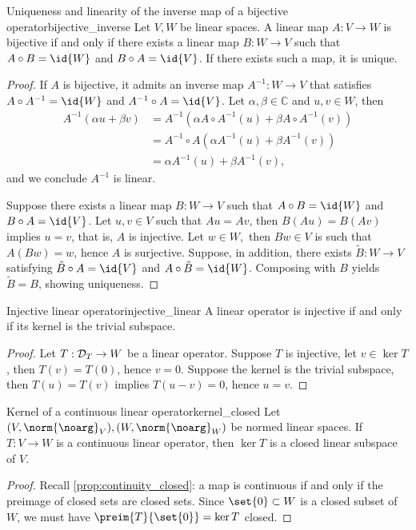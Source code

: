 \begin{proposition}{Uniqueness and linearity of the inverse map of a bijective operator}{bijective_inverse}
    Let \(V, W\) be linear spaces. A linear map \(A : V \to W\) is bijective if and only if there exists a linear map \(B : W \to V\) such that \(A\circ B = \id{W}\) and \(B \circ A = \id{V}\). If there exists such a map, it is unique.
\end{proposition}
\begin{proof}
    If \(A\) is bijective, it admits an inverse map \(A^{-1} : W \to V\) that satisfies \(A \circ A^{-1} = \id{W}\) and \(A^{-1} \circ A = \id{V}\). Let \(\alpha, \beta \in \mathbb{C}\) and \(u, v \in W\), then
    \begin{align*}
        A^{-1}(\alpha u + \beta v) &= A^{-1}\left(\alpha A\circ A^{-1}(u) + \beta A \circ A^{-1}(v)\right)\\
                                   &= A^{-1} \circ A \left(\alpha A^{-1}(u) + \beta A^{-1}(v)\right)\\
                                   &= \alpha A^{-1}(u) + \beta A^{-1}(v),
    \end{align*}
    and we conclude \(A^{-1}\) is linear.

    Suppose there exists a linear map \(B : W \to V\) such that \(A \circ B = \id{W}\) and \(B \circ A = \id{V}\). Let \(u, v \in V\) such that \(Au = Av\), then \(B(Au) = B(Av)\) implies \(u = v\), that is, \(A\) is injective. Let \(w \in W,\) then \(Bw \in V\) is such that \(A(Bw) = w\), hence \(A\) is surjective. Suppose, in addition, there exists \(\tilde{B} : W \to V\) satisfying \(\tilde{B} \circ A = \id{V}\) and \(A \circ \tilde{B} = \id{W}\). Composing with \(B\) yields \(\tilde{B} = B\), showing uniqueness.
\end{proof}

\begin{proposition}{Injective linear operator}{injective_linear}
    A linear operator is injective if and only if its kernel is the trivial subspace.
\end{proposition}
\begin{proof}
    Let \(T : \mathcal{D}_{T} \to W\) be a linear operator. Suppose \(T\) is injective, let \(v \in \ker{T}\), then \(T(v) = T(0)\), hence \(v = 0\). Suppose the kernel is the trivial subspace, then \(T(u) = T(v)\) implies \(T(u - v) = 0\), hence \(u = v\).
\end{proof}

\begin{proposition}{Kernel of a continuous linear operator}{kernel_closed}
    Let \((V, \norm{\noarg}_V), (W, \norm{\noarg}_W)\) be normed linear spaces. If \(T : V \to W\) is a continuous linear operator, then \(\ker{T}\) is a closed linear subspace of \(V\).
\end{proposition}
\begin{proof}
    Recall \cref{prop:continuity_closed}: a map is continuous if and only if the preimage of closed sets are closed sets. Since \(\set{0} \subset W\) is a closed subset of \(W\), we must have \(\preim{T}{\set{0}} = \ker{T}\) closed.
\end{proof}

